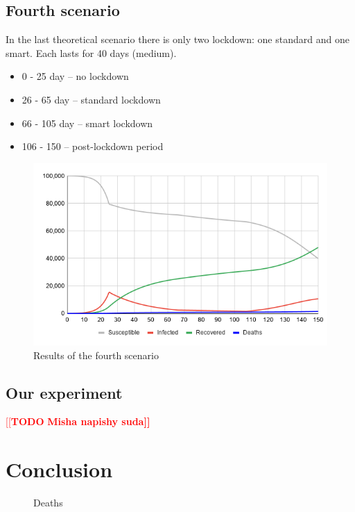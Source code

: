 \documentclass[12pt,a4paper,english]{article}
\newcommand{\todo}[1]{\noindent\textcolor{red}{[[\textbf{TODO} \textbf{#1]]}}\\}
\begin{document}
    \subsection{Fourth scenario}
    \label{fourth_scenario}
    In the last theoretical scenario there is only two lockdown: one standard and one smart.
    Each lasts for 40 days (medium).
    \begin{itemize}
        \item 0 - 25 day -- no lockdown
        \item 26 - 65 day -- standard lockdown 
        \item 66 - 105 day -- smart lockdown
        \item 106 - 150 -- post-lockdown period
    \end{itemize}
    \begin{figure}[h!]
        \centering
        \includegraphics[scale=0.55]{med+smart.png}
        \caption{Results of the fourth scenario}
    \end{figure}
    
    \newpage
    \subsection{Our experiment}

    \todo{Misha napishy suda}

    \newpage
    \section{Conclusion} 
    \begin{figure}[H]
        \centering
        \hfill
        \caption{Deaths}
    \end{figure}
\end{document}
